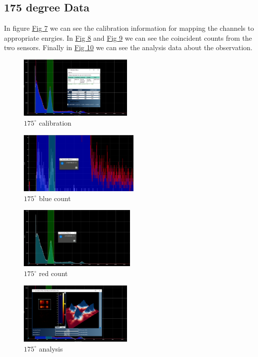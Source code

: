 	\subsection{175 degree Data}
		In figure \hyperref[obs:175cal]{Fig 7} we can see the calibration information for mapping the channels to appropriate enrgies. In \hyperref[obs:175blue]{Fig 8} and \hyperref[obs:175red]{Fig 9} we can see the coincident counts from the two sensors. Finally in \hyperref[obs:175]{Fig 10} we can see the analysis data about the observation.
		\begin{figure}[H]
			\centering
			\includegraphics[width=0.7\columnwidth, height=3cm]{images/175_cal.png}
			\caption{$175^\circ$ calibration}
			\label{obs:175cal}
		\end{figure}
		\begin{figure}[H]
			\centering
			\includegraphics[width=0.7\columnwidth, height=3cm]{images/175blue.png}
			\caption{$175^\circ$ blue count}
			\label{obs:175blue}
		\end{figure}
		\begin{figure}[H]
			\centering
			\includegraphics[width=0.7\columnwidth, height=3cm]{images/175red.png}
			\caption{$175^\circ$ red count}
			\label{obs:175red}
		\end{figure}
		\begin{figure}[H]
			\centering
			\includegraphics[width=0.7\columnwidth, height=3cm]{images/175.png}
			\caption{$175^\circ$ analysis}
			\label{obs:175}
		\end{figure}

